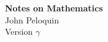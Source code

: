 %
%
%
\begin{center}
\textbf{\Huge Notes on Mathematics}\\
\bigskip
\bigskip
\bigskip
{\Large John Peloquin}\\
\bigskip
\bigskip
\bigskip
Version \(\gamma\)
\end{center}
\newpage
